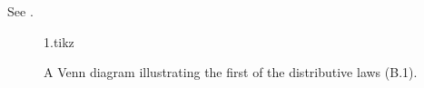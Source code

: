 See .
\begin{figure}[htb]
    {1.tikz}
    \caption{A Venn diagram illustrating the first of the distributive laws (B.1).} \label{fig:B.1-1}
\end{figure}
